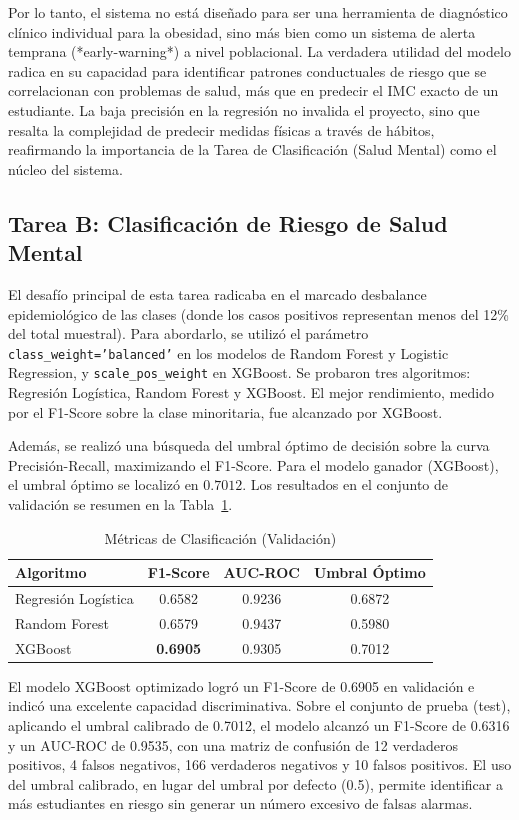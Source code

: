 \documentclass[10pt,journal,compsoc]{IEEEtran}
\begin{document}
Por lo tanto, el sistema no está diseñado para ser una herramienta de diagnóstico clínico individual para la obesidad, sino más bien como un sistema de alerta temprana (*early-warning*) a nivel poblacional. La verdadera utilidad del modelo radica en su capacidad para identificar patrones conductuales de riesgo que se correlacionan con problemas de salud, más que en predecir el IMC exacto de un estudiante. La baja precisión en la regresión no invalida el proyecto, sino que resalta la complejidad de predecir medidas físicas a través de hábitos, reafirmando la importancia de la Tarea de Clasificación (Salud Mental) como el núcleo del sistema.

\subsection{Tarea B: Clasificación de Riesgo de Salud Mental}
El desafío principal de esta tarea radicaba en el marcado desbalance epidemiológico de las clases (donde los casos positivos representan menos del 12\% del total muestral). Para abordarlo, se utilizó el parámetro \texttt{class\_weight='balanced'} en los modelos de Random Forest y Logistic Regression, y \texttt{scale\_pos\_weight} en XGBoost. Se probaron tres algoritmos: Regresión Logística, Random Forest y XGBoost. El mejor rendimiento, medido por el F1-Score sobre la clase minoritaria, fue alcanzado por XGBoost.

Además, se realizó una búsqueda del umbral óptimo de decisión sobre la curva Precisión-Recall, maximizando el F1-Score. Para el modelo ganador (XGBoost), el umbral óptimo se localizó en $0.7012$. Los resultados en el conjunto de validación se resumen en la Tabla~\ref{tab:clasificacion}.

\begin{table}[htbp]
\caption{Métricas de Clasificación (Validación)}
\label{tab:clasificacion}
\centering
\begin{tabular}{lccc}
\toprule
\textbf{Algoritmo} & \textbf{F1-Score} & \textbf{AUC-ROC} & \textbf{Umbral Óptimo} \\
\midrule
Regresión Logística & 0.6582 & 0.9236 & 0.6872 \\
Random Forest & 0.6579 & 0.9437 & 0.5980 \\
XGBoost & \textbf{0.6905} & 0.9305 & 0.7012 \\
\bottomrule
\end{tabular}
\end{table}

El modelo XGBoost optimizado logró un F1-Score de 0.6905 en validación e indicó una excelente capacidad discriminativa. Sobre el conjunto de prueba (test), aplicando el umbral calibrado de 0.7012, el modelo alcanzó un F1-Score de 0.6316 y un AUC-ROC de 0.9535, con una matriz de confusión de 12 verdaderos positivos, 4 falsos negativos, 166 verdaderos negativos y 10 falsos positivos. El uso del umbral calibrado, en lugar del umbral por defecto (0.5), permite identificar a más estudiantes en riesgo sin generar un número excesivo de falsas alarmas.
\end{document}
